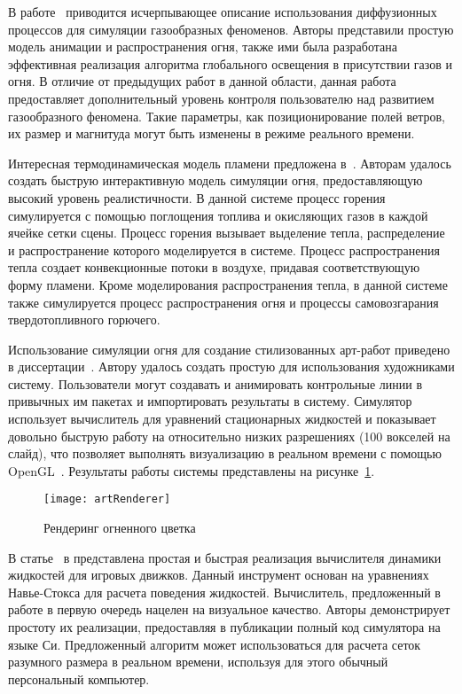 В работе~\cite{DiffusionProcesses} приводится исчерпывающее описание
использования диффузионных процессов для симуляции газообразных феноменов.
Авторы представили простую модель анимации и распространения огня, также ими
была разработана эффективная реализация алгоритма глобального освещения в
присутствии газов и огня. В отличие от предыдущих работ в данной области, данная
работа предоставляет дополнительный уровень контроля пользователю над развитием
газообразного феномена. Такие параметры, как позиционирование полей ветров, их
размер и магнитуда могут быть изменены в режиме реального времени.

Интересная термодинамическая модель пламени предложена
в~\cite{InteractiveSimulation}. Авторам удалось создать быструю интерактивную
модель симуляции огня, предоставляющую высокий уровень реалистичности. В данной
системе процесс горения симулируется с помощью поглощения топлива и окисляющих
газов в каждой ячейке сетки сцены. Процесс горения вызывает выделение тепла,
распределение и распространение которого моделируется в системе. Процесс
распространения тепла создает конвекционные потоки в воздухе, придавая
соответствующую форму пламени. Кроме моделирования распространения тепла, в
данной системе также симулируется процесс распространения огня и процессы
самовозгарания твердотопливного горючего.

Использование симуляции огня для создание стилизованных арт-работ приведено в
диссертации~\cite{Bangalore2012ATF}. Автору удалось создать простую для
использования художниками систему. Пользователи могут создавать и анимировать
контрольные линии в привычных им пакетах и импортировать результаты в систему.
Симулятор использует вычислитель для уравнений стационарных жидкостей и
показывает довольно быструю работу на относительно низких разрешениях (100
вокселей на слайд), что позволяет выполнять визуализацию в реальном времени с
помощью OpenGL~\@. Результаты работы системы представлены на
рисунке~\ref{fig:artRenderer}.
\begin{figure}[htb]
	\centering
    \texttt{[image: artRenderer]}
    \caption{Рендеринг огненного цветка}%
    \label{fig:artRenderer}
\end{figure}

В статье~\cite{ForGames} в представлена простая и быстрая
реализация вычислителя динамики жидкостей для игровых движков. Данный инструмент
основан на уравнениях Навье-Стокса для расчета поведения жидкостей. Вычислитель,
предложенный в работе в первую очередь нацелен на визуальное качество. Авторы
демонстрирует простоту их реализации, предоставляя в публикации полный код
симулятора на языке Си. Предложенный алгоритм может использоваться для расчета
сеток разумного размера в реальном времени, используя для этого обычный
персональный компьютер.

